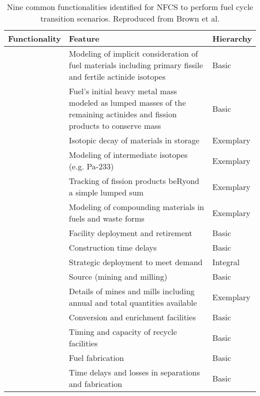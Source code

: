 \begin{table}[h]
    \centering
    \caption {Nine common functionalities identified for \gls{NFCS} to perform
    			fuel cycle transition scenarios. Reproduced from Brown et al. \cite{brown_identification_2016}}
    \label{tab:ffh}
    \begin{tabularx}{\textwidth}{lXl}
        \hline
        \textbf{Functionality}&\textbf{Feature} &\textbf{Hierarchy} \\
        \hline
         & Modeling of implicit consideration of fuel materials including primary fissile and fertile actinide isotopes & Basic \\
        	& Fuel's initial heavy metal mass modeled as lumped masses  of the remaining actinides and fission products to conserve mass & Basic \\
        	& Isotopic decay of materials in storage & Exemplary \\
        	& Modeling of intermediate isotopes (e.g. Pa-233) & Exemplary \\
        	& Tracking of fission products beRyond a simple lumped sum & Exemplary \\
        	& Modeling of compounding materials in fuels and waste forms & Exemplary\\

        \hline

         & Facility deployment and retirement & Basic \\
        	& Construction time delays & Basic \\
        	& Strategic deployment to meet demand &Integral \\

        \hline

         & Source (mining and milling) & Basic \\
        	& Details of mines and mills including annual and total quantities available & Exemplary \\
        	& Conversion and enrichment facilities & Basic \\
        	& Timing and capacity of recycle facilities & Basic \\
        	& Fuel fabrication & Basic \\
        	& Time delays and losses in separations and fabrication & Basic \\


\end{tabularx}
\end{table}
